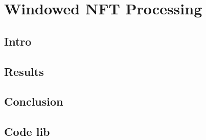 \chapter{Windowed NFT Processing}

\section{Intro}




\section{Results}


\section{Conclusion}


\section{Code lib}